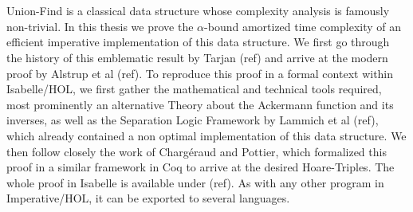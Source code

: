 \chapter{\abstractname}

Union-Find is a classical data structure whose complexity analysis is famously non-trivial. In this thesis we prove the $\alpha$-bound amortized time complexity of an efficient imperative implementation of this data structure. We first go through the history of this emblematic result by Tarjan (ref) and arrive at the modern proof by Alstrup et al (ref). 
To reproduce this proof in a formal context within Isabelle/HOL, we first gather the mathematical and technical tools required, most prominently an alternative Theory about the Ackermann function and its inverses, as well as the Separation Logic Framework by Lammich et al (ref), which already contained a non optimal implementation of this data structure.
We then follow closely the work of Chargéraud and Pottier, which formalized this proof in a similar framework in Coq to arrive at the desired Hoare-Triples. The whole proof in Isabelle is available under (ref). As with any other program in Imperative/HOL, it can be exported to several languages.

